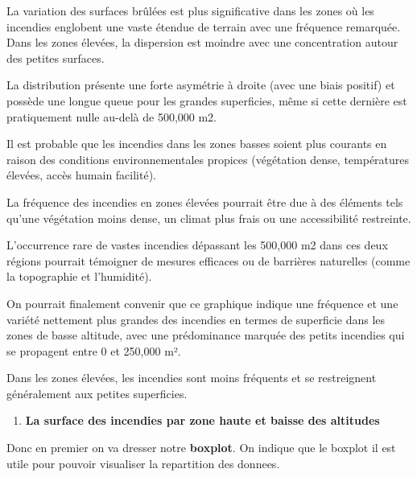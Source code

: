 \documentclass[
]{article}
\providecommand{\tightlist}{%
  \setlength{\itemsep}{0pt}\setlength{\parskip}{0pt}}
\begin{document}
La variation des surfaces brûlées est plus significative dans les zones
où les incendies englobent une vaste étendue de terrain avec une
fréquence remarquée. Dans les zones élevées, la dispersion est moindre
avec une concentration autour des petites surfaces.

La distribution présente une forte asymétrie à droite (avec une biais
positif) et possède une longue queue pour les grandes superficies, même
si cette dernière est pratiquement nulle au-delà de 500,000 m2.

Il est probable que les incendies dans les zones basses soient plus
courants en raison des conditions environnementales propices (végétation
dense, températures élevées, accès humain facilité).

La fréquence des incendies en zones élevées pourrait être due à des
éléments tels qu'une végétation moins dense, un climat plus frais ou une
accessibilité restreinte.

L'occurrence rare de vastes incendies dépassant les 500,000 m2 dans ces
deux régions pourrait témoigner de mesures efficaces ou de barrières
naturelles (comme la topographie et l'humidité).

On pourrait finalement convenir que ce graphique indique une fréquence
et une variété nettement plus grandes des incendies en termes de
superficie dans les zones de basse altitude, avec une prédominance
marquée des petits incendies qui se propagent entre 0 et 250,000 m².

Dans les zones élevées, les incendies sont moins fréquents et se
restreignent généralement aux petites superficies.

\begin{enumerate}
\def\labelenumi{\arabic{enumi}.}
\setcounter{enumi}{1}
\tightlist
\item
  \textbf{La surface des incendies par zone haute et baisse des
  altitudes}
\end{enumerate}

Donc en premier on va dresser notre \textbf{boxplot}. On indique que le
boxplot il est utile pour pouvoir visualiser la repartition des donnees.
\end{document}
